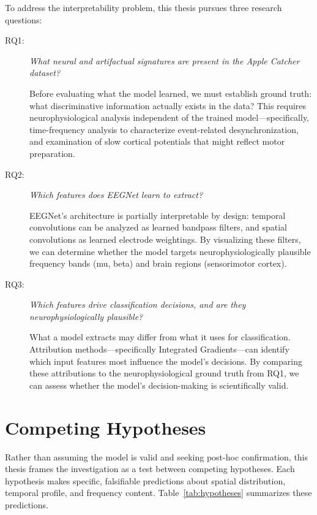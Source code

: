 To address the interpretability problem, this thesis pursues three research questions:

\begin{description}
    \item[RQ1:] \textit{What neural and artifactual signatures are present in the Apple Catcher dataset?}
    
    Before evaluating what the model learned, we must establish ground truth: what discriminative information actually exists in the data? This requires neurophysiological analysis independent of the trained model—specifically, time-frequency analysis to characterize event-related desynchronization, and examination of slow cortical potentials that might reflect motor preparation.
    
    \item[RQ2:] \textit{Which features does EEGNet learn to extract?}
    
    EEGNet's architecture is partially interpretable by design: temporal convolutions can be analyzed as learned bandpass filters, and spatial convolutions as learned electrode weightings. By visualizing these filters, we can determine whether the model targets neurophysiologically plausible frequency bands (mu, beta) and brain regions (sensorimotor cortex).
    
    \item[RQ3:] \textit{Which features drive classification decisions, and are they neurophysiologically plausible?}
    
    What a model extracts may differ from what it uses for classification. Attribution methods—specifically Integrated Gradients—can identify which input features most influence the model's decisions. By comparing these attributions to the neurophysiological ground truth from RQ1, we can assess whether the model's decision-making is scientifically valid.
\end{description}


\section{Competing Hypotheses}
\label{sec:intro_hypotheses}

Rather than assuming the model is valid and seeking post-hoc confirmation, this thesis frames the investigation as a test between competing hypotheses. Each hypothesis makes specific, falsifiable predictions about spatial distribution, temporal profile, and frequency content. Table~\ref{tab:hypotheses} summarizes these predictions.

